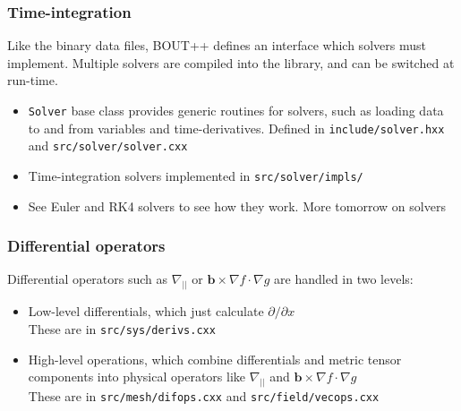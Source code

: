 \documentclass{beamer}
\begin{document}
\begin{frame}[fragile]
  \frametitle{Time-integration}
  
  Like the binary data files, BOUT++ defines an interface which solvers
  must implement. Multiple solvers are compiled into the library, and can
  be switched at run-time.
  
  \begin{itemize}
  \item \texttt{Solver} base class provides generic routines for solvers, 
    such as loading data to and from variables and time-derivatives.
    Defined in \texttt{include/solver.hxx} and \texttt{src/solver/solver.cxx}
  \item Time-integration solvers implemented in \texttt{src/solver/impls/}
  \item See Euler and RK4 solvers to see how they work. More tomorrow on solvers
  \end{itemize}
\end{frame}

\begin{frame}
  \frametitle{Differential operators}
  
  Differential operators such as $\nabla_{||}$ or $\mathbf{b}\times\nabla f \cdot \nabla g$ are handled in two levels:
  \begin{itemize}
  \item Low-level differentials, which just calculate $\partial / \partial x$  \\
    These are in \texttt{src/sys/derivs.cxx}
  \item High-level operations, which combine differentials and metric tensor
    components into physical operators like $\nabla_{||}$ and 
    $\mathbf{b}\times\nabla f \cdot \nabla g$ \\
    These are in \texttt{src/mesh/difops.cxx} and \texttt{src/field/vecops.cxx}
  \end{itemize}
  
\end{frame}
\end{document}
